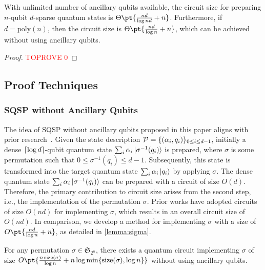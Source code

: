 \documentclass[a4paper,UKenglish,cleveref, autoref, thm-restate]{lipics-v2021}
\DeclarePairedDelimiter\cbra{\{}{\}}
\DeclarePairedDelimiter\ceil{\lceil}{\rceil}
\newcommand{\bo}{O\pt}
\newcommand{\ta}{\Theta\pt}
\begin{document}
\begin{theorem}\label{thm: umlimited}
    {With unlimited  number of ancillary qubits available}, the circuit size for preparing $n$-qubit $d$-sparse quantum states is $\ta{\frac{nd}{\log nd} + n}$. Furthermore, if $d =\mathrm{poly}(n)$, then the circuit size is $\ta{\frac{nd}{\log n} + n}$, which can be achieved without using ancillary qubits.
\end{theorem}


\begin{proof}\textcolor{red}{TOPROVE 0}\end{proof}

\subsection{Proof Techniques}

\subsubsection{SQSP  without Ancillary Qubits}

The idea of  SQSP  without ancillary qubits proposed in this paper aligns with prior research~\cite{malvetti2021quantum, ramacciotti2023simple}. Given the state description  $\mathcal{P} = \cbra{(\alpha_i, q_i)}_{0\leq i \leq d-1}$, initially a dense $\ceil{\log d}$-qubit quantum state $\sum_i \alpha_i \ket{\sigma^{-1}(q_i)}$ is prepared, where $\sigma$ is some permutation such that $0 \leq \sigma^{-1}(q_i) \leq d - 1$. Subsequently, this state is transformed into the target quantum state $\sum_i \alpha_i \ket{q_i}$ by applying $\sigma$. The dense quantum state  $\sum_i \alpha_i \ket{\sigma^{-1}(q_i)}$ can be prepared with a circuit of size $O(d)$. Therefore, the primary contribution to circuit size arises from the second step, i.e., the implementation of the permutation $\sigma$. Prior works \cite{malvetti2021quantum, ramacciotti2023simple} have adopted circuits of size $O(nd)$ for implementing $\sigma$, which results in an overall circuit size of $O(nd)$. In comparison, we develop a method for implementing $\sigma$ with a size of $\bo{\frac{nd}{\log n}+n}$, as detailed in \cref{lemma:sigma}. 


\begin{lemma}\label{lemma:sigma}
For any permutation $\sigma \in \mathfrak{S}_{2^n}$, there exists a quantum circuit implementing $\sigma$ of size $\bo{\frac{n\,\mathrm{size}(\sigma)}{\log n} + n\log\min\cbra{\mathrm{size}(\sigma), \log n}}$ without using ancillary qubits. 
\end{lemma}
\end{document}
